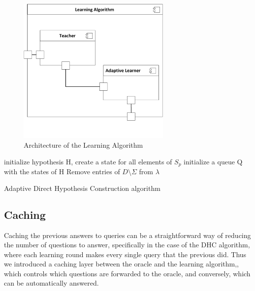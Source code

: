 \begin{figure}[!ht] 
	\centering
	\includegraphics[width=75mm, keepaspectratio]{figures/architecture_learningalgo.png}
	\caption{Architecture of the Learning Algorithm} 
	\label{fig_architcture_learningalgo}
\end{figure}

\begin{algorithm}[H]
	\SetAlgoLined
	\DontPrintSemicolon
	initialize hypothesis H, create a state for all elements of $S_p$\;
	initialize a queue Q with the states of H\;
	Remove entries of $D\setminus\Sigma$ from $\lambda$\;
	\;
	\caption{Adaptive Direct Hypothesis Construction algorithm}
	\label{algo:adaptivedhc}
\end{algorithm}
\subsection{Caching} \label{subs_cachingintheframework}
Caching the previous answers to queries can be a straightforward way of reducing the number of questions to answer, specifically in the case of the DHC algorithm, where each learning round makes every single query that the previous did. Thus we introduced a caching layer between the oracle and the learning algorithm,, which controls which questions are forwarded to the oracle, and conversely, which can be automatically answered.

